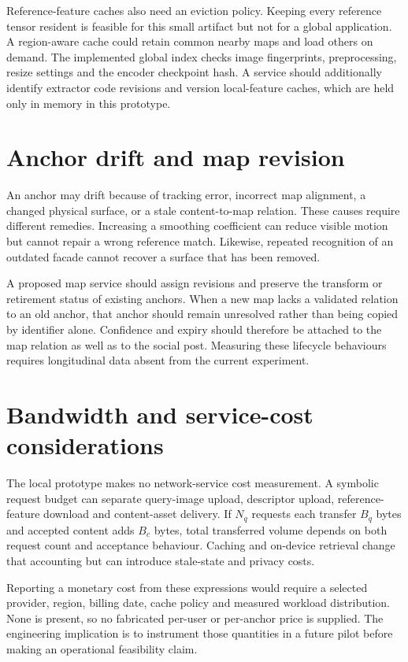 Reference-feature caches also need an eviction policy. Keeping every reference tensor resident is feasible for this small artifact but not for a global application. A region-aware cache could retain common nearby maps and load others on demand. The implemented global index checks image fingerprints, preprocessing, resize settings and the encoder checkpoint hash. A service should additionally identify extractor code revisions and version local-feature caches, which are held only in memory in this prototype.
\fi

\ifFullReport
\section{Anchor drift and map revision}
An anchor may drift because of tracking error, incorrect map alignment, a changed physical surface, or a stale content-to-map relation. These causes require different remedies. Increasing a smoothing coefficient can reduce visible motion but cannot repair a wrong reference match. Likewise, repeated recognition of an outdated facade cannot recover a surface that has been removed.

A proposed map service should assign revisions and preserve the transform or retirement status of existing anchors. When a new map lacks a validated relation to an old anchor, that anchor should remain unresolved rather than being copied by identifier alone. Confidence and expiry should therefore be attached to the map relation as well as to the social post. Measuring these lifecycle behaviours requires longitudinal data absent from the current experiment.
\fi

\ifFullReport
\section{Bandwidth and service-cost considerations}
The local prototype makes no network-service cost measurement. A symbolic request budget can separate query-image upload, descriptor upload, reference-feature download and content-asset delivery. If $N_q$ requests each transfer $B_q$ bytes and accepted content adds $B_c$ bytes, total transferred volume depends on both request count and acceptance behaviour. Caching and on-device retrieval change that accounting but can introduce stale-state and privacy costs.

Reporting a monetary cost from these expressions would require a selected provider, region, billing date, cache policy and measured workload distribution. None is present, so no fabricated per-user or per-anchor price is supplied. The engineering implication is to instrument those quantities in a future pilot before making an operational feasibility claim.
\fi

